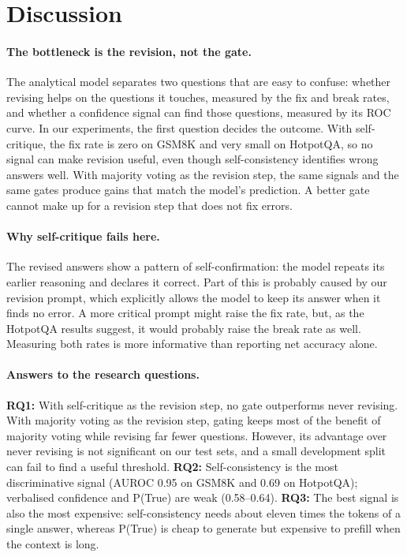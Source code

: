 \section{Discussion}
\label{sec:discussion}

\paragraph{The bottleneck is the revision, not the gate.} The analytical model separates two questions that are easy to confuse: whether revising helps on the questions it touches, measured by the fix and break rates, and whether a confidence signal can find those questions, measured by its ROC curve. In our experiments, the first question decides the outcome. With self-critique, the fix rate is zero on GSM8K and very small on HotpotQA, so no signal can make revision useful, even though self-consistency identifies wrong answers well. With majority voting as the revision step, the same signals and the same gates produce gains that match the model's prediction. A better gate cannot make up for a revision step that does not fix errors.

\paragraph{Why self-critique fails here.} The revised answers show a pattern of self-confirmation: the model repeats its earlier reasoning and declares it correct. Part of this is probably caused by our revision prompt, which explicitly allows the model to keep its answer when it finds no error. A more critical prompt might raise the fix rate, but, as the HotpotQA results suggest, it would probably raise the break rate as well. Measuring both rates is more informative than reporting net accuracy alone.

\paragraph{Answers to the research questions.} \textbf{RQ1:} With self-critique as the revision step, no gate outperforms never revising. With majority voting as the revision step, gating keeps most of the benefit of majority voting while revising far fewer questions. However, its advantage over never revising is not significant on our test sets, and a small development split can fail to find a useful threshold. \textbf{RQ2:} Self-consistency is the most discriminative signal (AUROC 0.95 on GSM8K and 0.69 on HotpotQA); verbalised confidence and P(True) are weak (0.58--0.64). \textbf{RQ3:} The best signal is also the most expensive: self-consistency needs about eleven times the tokens of a single answer, whereas P(True) is cheap to generate but expensive to prefill when the context is long.


